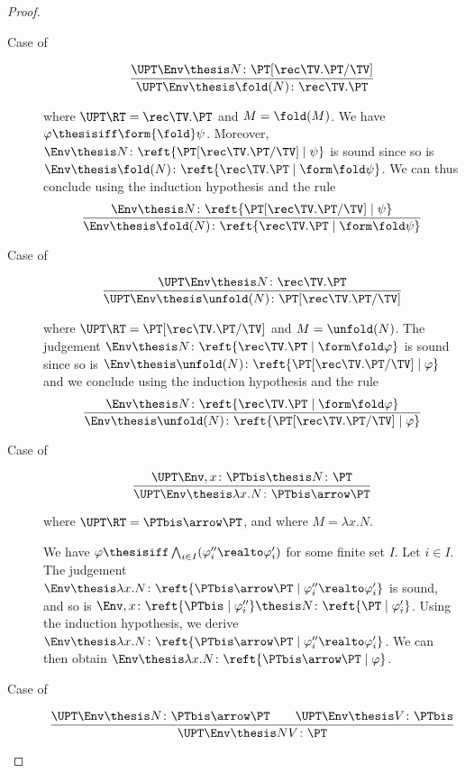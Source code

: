 \begin{proof}
\begin{description}
\item[Case of]
\[
\dfrac{\UPT\Env \thesis N \colon \PT[\rec\TV.\PT / \TV]}
  {\UPT\Env \thesis \fold(N) \colon \rec\TV.\PT}
\]

\noindent
where $\UPT\RT = \rec\TV.\PT$ and $M = \fold(M)$.
%
We have $\varphi \thesisiff \form{\fold}\psi$.
Moreover, 
$\Env \thesis N \colon \reft{\PT[\rec\TV.\PT / \TV] \mid \psi}$
is sound
since so is
$\Env \thesis \fold(N) \colon \reft{\rec\TV.\PT \mid \form\fold\psi}$.
We can thus conclude using the induction hypothesis and the rule
\[
\dfrac{\Env \thesis N \colon \reft{\PT[\rec\TV.\PT/\TV] \mid \psi}}
  {\Env \thesis \fold(N) \colon \reft{\rec\TV.\PT \mid \form\fold \psi}}
\]

\item[Case of]
\[
\dfrac{\UPT\Env \thesis N \colon \rec\TV.\PT}
  {\UPT\Env \thesis \unfold(N) \colon \PT[\rec\TV.\PT / \TV]}
\]

\noindent
where $\UPT\RT = \PT[\rec\TV.\PT/\TV]$
and $M = \unfold(N)$.
%
The judgement 
$\Env \thesis N \colon \reft{\rec\TV.\PT \mid \form\fold \varphi}$
is sound
since so is
$\Env \thesis \unfold(N) \colon \reft{\PT[\rec\TV.\PT / \TV] \mid  \varphi}$
and we conclude using the induction hypothesis and the rule
\[
\dfrac{\Env \thesis N \colon \reft{\rec\TV.\PT \mid \form\fold \varphi}}
  {\Env \thesis \unfold(N) \colon \reft{\PT[\rec\TV.\PT/\TV] \mid \varphi}}
\]

\item[Case of]
\[
\dfrac{\UPT\Env,x\colon\PTbis \thesis N \colon \PT}
  {\UPT\Env \thesis \lambda x.N \colon \PTbis \arrow \PT}
\]

\noindent
where $\UPT\RT = \PTbis \arrow \PT$,
and where $M = \lambda x.N$.

We have $\varphi \thesisiff \bigwedge_{i \in I}(\varphi''_i \realto \varphi'_i)$
for some finite set $I$.
Let $i \in I$.
The judgement
\(
  \Env
  \thesis
  \lambda x.N \colon
  \reft{\PTbis \arrow \PT \mid \varphi''_i \realto \varphi'_i}
\)
is sound,
and so is
\(
  \Env, x \colon \reft{\PTbis \mid \varphi''_i}
  \thesis
  N \colon
  \reft{\PT \mid \varphi'_i}
\).
Using the induction hypothesis, we derive
\(
  \Env
  \thesis
  \lambda x.N \colon
  \reft{\PTbis \arrow \PT \mid \varphi''_i \realto \varphi'_i}
\).
We can then obtain
\(
  \Env
  \thesis
  \lambda x.N \colon
  \reft{\PTbis \arrow \PT \mid \varphi}
\).


\item[Case of]
\[
\dfrac{\UPT\Env \thesis N \colon \PTbis \arrow \PT
  \qquad
  \UPT\Env \thesis V \colon \PTbis}
  {\UPT\Env \thesis N V \colon \PT}
\]


\end{description}
\end{proof}
